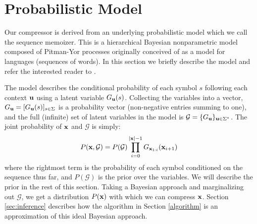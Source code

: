 \section{Probabilistic Model}

Our compressor is derived from an underlying probabilistic model which we call
the sequence memoizer.  This is a hierarchical Bayesian nonparametric model
composed of Pitman-Yor processes originally conceived of as a model for
languages (sequences of words).   In this section we briefly describe the
model and refer the interested reader to \citep{Teh:ACL06,wood2009sms}.

\def\GG{\mathcal{G}} The model describes the conditional probability of each
symbol $s$ following each context $\ubf$ using a latent variable $G_\ubf(s)$.
Collecting the variables into a vector, $G_\ubf=[G_\ubf(s)]_{s\in\Sigma}$ is a
probability vector (non-negative entries summing to one), and the full
(infinite) set of latent variables in the model is
$\GG=\{G_\ubf\}_{\ubf\in\Sigma^*}$.  The joint probability of $\xbf$ and $\GG$
is simply:
\begin{align}
P(\xbf,\GG) = P(\GG)\prod_{i=0}^{|\xbf|-1}G_{\xbf_{1:i}}(\xbf_{i+1})
\end{align}
where the rightmost term is the probability of each symbol conditioned on the sequence thus far, and $P(\GG)$ is the prior over the variables.  We will describe the prior in the rest of this section.  Taking a Bayesian approach and marginalizing out $\GG$, we get a distribution $P(\xbf)$ with which we can compress $\xbf$.  Section \ref{sec:inference} describes how the algorithm in Section \ref{algorithm} is an approximation of this ideal Bayesian approach.



